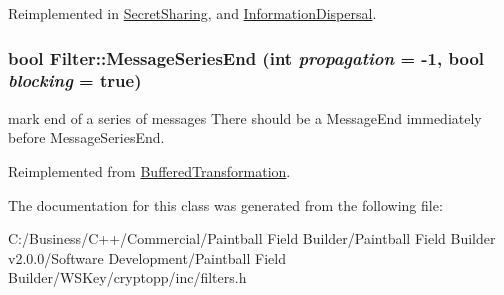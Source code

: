 Reimplemented in \hyperlink{class_secret_sharing_a670b6f5ba7ee9e1f029cd199f6722bb6}{SecretSharing}, and \hyperlink{class_information_dispersal_aa348e2dd4609c563196f89e1cf2ad35c}{InformationDispersal}.\hypertarget{class_filter_aa42c62587dda61266ac8195d9c9edb47}{
\subsubsection[{MessageSeriesEnd}]{\setlength{\rightskip}{0pt plus 5cm}bool Filter::MessageSeriesEnd (int {\em propagation} = {\ttfamily -\/1}, \/  bool {\em blocking} = {\ttfamily true})}}
\label{class_filter_aa42c62587dda61266ac8195d9c9edb47}


mark end of a series of messages There should be a MessageEnd immediately before MessageSeriesEnd. 

Reimplemented from \hyperlink{class_buffered_transformation_a9c9abc61e1cc6c8541a5657e68df1f36}{BufferedTransformation}.

The documentation for this class was generated from the following file:\begin{DoxyCompactItemize}
\item 
C:/Business/C++/Commercial/Paintball Field Builder/Paintball Field Builder v2.0.0/Software Development/Paintball Field Builder/WSKey/cryptopp/inc/filters.h\end{DoxyCompactItemize}
